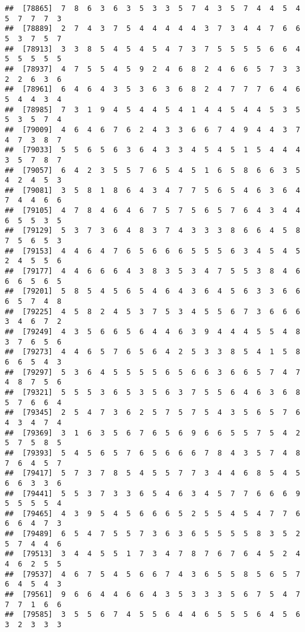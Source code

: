 \documentclass[
]{book}
\begin{document}
\begin{verbatim}
##  [78865]  7  8  6  3  6  3  5  3  3  5  7  4  3  5  7  4  4  5  4  5  7  7  7  3
##  [78889]  2  7  4  3  7  5  4  4  4  4  4  3  7  3  4  4  7  6  6  5  3  7  5  7
##  [78913]  3  3  8  5  4  5  4  5  4  7  3  7  5  5  5  5  6  6  4  5  5  5  5  5
##  [78937]  4  7  5  5  4  5  9  2  4  6  8  2  4  6  6  5  7  3  3  2  2  6  3  6
##  [78961]  6  4  6  4  3  5  3  6  3  6  8  2  4  7  7  7  6  4  6  5  4  4  3  4
##  [78985]  7  3  1  9  4  5  4  4  5  4  1  4  4  5  4  4  5  3  5  5  3  5  7  4
##  [79009]  4  6  4  6  7  6  2  4  3  3  6  6  7  4  9  4  4  3  7  4  7  3  8  7
##  [79033]  5  5  6  5  6  3  6  4  3  3  4  5  4  5  1  5  4  4  4  3  5  7  8  7
##  [79057]  6  4  2  3  5  5  7  6  5  4  5  1  6  5  8  6  6  3  5  4  2  4  5  3
##  [79081]  3  5  8  1  8  6  4  3  4  7  7  5  6  5  4  6  3  6  4  7  4  4  6  6
##  [79105]  4  7  8  4  6  4  6  7  5  7  5  6  5  7  6  4  3  4  4  6  5  5  3  5
##  [79129]  5  3  7  3  6  4  8  3  7  4  3  3  3  8  6  6  4  5  8  7  5  6  5  3
##  [79153]  4  4  6  4  7  6  5  6  6  6  5  5  5  6  3  4  5  4  5  2  4  5  5  6
##  [79177]  4  4  6  6  6  4  3  8  3  5  3  4  7  5  5  3  8  4  6  6  6  5  6  5
##  [79201]  5  8  5  4  5  6  5  4  6  4  3  6  4  5  6  3  3  6  6  6  5  7  4  8
##  [79225]  4  5  8  2  4  5  3  7  5  3  4  5  5  6  7  3  6  6  6  3  4  6  7  2
##  [79249]  4  3  5  6  6  5  6  4  4  6  3  9  4  4  4  5  5  4  8  3  7  6  5  6
##  [79273]  4  4  6  5  7  6  5  6  4  2  5  3  3  8  5  4  1  5  8  6  6  5  4  3
##  [79297]  5  3  6  4  5  5  5  5  6  5  6  6  3  6  6  5  7  4  7  4  8  7  5  6
##  [79321]  5  5  5  3  6  5  3  5  6  3  7  5  5  6  4  6  3  6  8  5  7  6  6  4
##  [79345]  2  5  4  7  3  6  2  5  7  5  7  5  4  3  5  6  5  7  6  4  3  4  7  4
##  [79369]  3  1  6  3  5  6  7  6  5  6  9  6  6  5  5  7  5  4  2  5  7  5  8  5
##  [79393]  5  4  5  6  5  7  6  5  6  6  6  7  8  4  3  5  7  4  8  7  6  4  5  7
##  [79417]  5  7  3  7  8  5  4  5  5  7  7  3  4  4  6  8  5  4  5  6  6  3  3  6
##  [79441]  5  5  3  7  3  3  6  5  4  6  3  4  5  7  7  6  6  6  9  5  5  5  5  4
##  [79465]  4  3  9  5  4  5  6  6  6  5  2  5  5  4  5  4  7  7  6  6  6  4  7  3
##  [79489]  6  5  4  7  5  5  7  3  6  3  6  5  5  5  5  8  3  5  2  5  7  4  4  6
##  [79513]  3  4  4  5  5  1  7  3  4  7  8  7  6  7  6  4  5  2  4  4  6  2  5  5
##  [79537]  4  6  7  5  4  5  6  6  7  4  3  6  5  5  8  5  6  5  7  6  4  5  4  3
##  [79561]  9  6  6  4  4  6  6  4  3  5  3  3  3  5  6  7  5  4  7  7  7  1  6  6
##  [79585]  3  5  5  6  7  4  5  5  6  4  4  6  5  5  5  6  4  5  6  3  2  3  3  3

\end{verbatim}
\end{document}
